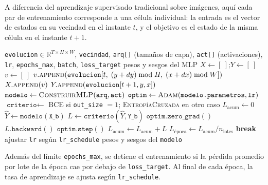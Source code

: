 A diferencia del aprendizaje supervisado tradicional sobre imágenes, aquí cada par de entrenamiento corresponde a una célula individual: la entrada es el vector de estados en su vecindad en el instante $t$, y el objetivo es el estado de la misma célula en el instante $t+1$.

\begin{breakablealgorithm}
\caption{EntrenarNCA: ajuste del MLP a partir de una evolución registrada}
\label{alg:entrenar}
\begin{algorithmic}[1]
\Require \texttt{evolucion}$\in \mathbb{R}^{T \times H \times W}$, \texttt{vecindad}, \texttt{arq[]} (tamaños de capa), \texttt{act[]} (activaciones), \texttt{lr}, \texttt{epochs\_max}, \texttt{batch}, \texttt{loss\_target}
\Ensure pesos y sesgos del MLP
\Statex
\State $X \gets [\ ]$;\quad $Y \gets [\ ]$ 
            \State $v \gets [\ ]$
                \State $v.\textsc{append}(\texttt{evolucion}[t,\; (y+dy) \bmod H,\; (x+dx) \bmod W])$
            \EndFor
            \State $X.\textsc{append}(v)$
            \State $Y.\textsc{append}(\texttt{evolucion}[t+1, y, x])$
        \EndFor
    \EndFor
\EndFor
\Statex
\State $\texttt{modelo} \gets \textsc{ConstruirMLP}(\texttt{arq}, \texttt{act})$
\State $\texttt{optim} \gets \textsc{Adam}(\texttt{modelo.parametros}, \texttt{lr})$
\State $\texttt{criterio} \gets$ \textsc{BCE} si \texttt{out\_size} $= 1$; \textsc{EntropíaCruzada} en otro caso
\Statex
{}
    \State $L_{\text{acum}} \gets 0$
        \State $\hat{Y} \gets \texttt{modelo}(\texttt{X\_b})$
        \State $L \gets \texttt{criterio}(\hat{Y}, \texttt{Y\_b})$
        \State $\texttt{optim.zero\_grad}()$
        \State $L.\texttt{backward}()$
        \State $\texttt{optim.step}()$
        \State $L_{\text{acum}} \gets L_{\text{acum}} + L$
    \EndFor
    \State $L_{\text{época}} \gets L_{\text{acum}} / n_{\text{lotes}}$
     \State \textbf{break} \EndIf
    \State ajustar \texttt{lr} según \texttt{lr\_schedule}
\EndFor
\State \Return pesos y sesgos del \texttt{modelo}
\end{algorithmic}
\end{breakablealgorithm}

Además del límite \texttt{epochs\_max}, se detiene el entrenamiento si la pérdida promedio por lote de la época cae por debajo de \texttt{loss\_target}. Al final de cada época, la tasa de aprendizaje se ajusta según \texttt{lr\_schedule}. 

